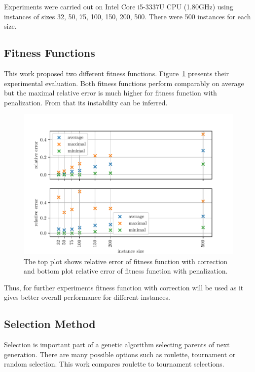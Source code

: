 \documentclass{article}
\begin{document}
Experiments were carried out on Intel Core i5-3337U CPU (1.80GHz)
using instances of sizes 32, 50, 75, 100, 150, 200, 500.
There were 500 instances for each size.

\subsection{Fitness Functions}

This work proposed two different fitness functions.
Figure~\ref{fitness} presents their experimental evaluation.
Both fitness functions perform comparably on average
but the maximal relative error is much higher
for fitness function with penalization.
From that its instability can be inferred.

\begin{figure}[ht]
\vskip 0.2in
\begin{center}
\centerline{\includegraphics[width=\columnwidth]{figs/fitness}}
\caption{The top plot shows relative error of fitness function with
correction and bottom plot relative error of fitness function with
penalization.}
\label{fitness}
\end{center}
\vskip -0.2in
\end{figure}

Thus, for further experiments fitness function with correction will be used
as it gives better overall performance for different instances.

\subsection{Selection Method}

Selection is important part of a genetic algorithm selecting parents of next
generation.
There are many possible options such as roulette, tournament
or random selection.
This work compares roulette to tournament selections.
\end{document}
